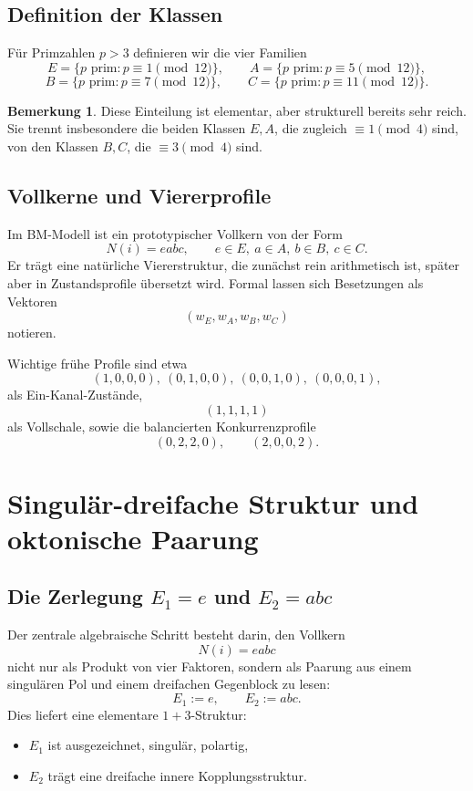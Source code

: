 \documentclass[11pt,a4paper]{article}
\theoremstyle{definition}
\newtheorem{bemerkung}[definition]{Bemerkung}
\theoremstyle{plain}
\begin{document}
	\subsection{Definition der Klassen}
	
	Für Primzahlen $p>3$ definieren wir die vier Familien
	\[
	E=\{p\text{ prim}:p\equiv 1\pmod{12}\},
	\qquad
	A=\{p\text{ prim}:p\equiv 5\pmod{12}\},
	\]
	\[
	B=\{p\text{ prim}:p\equiv 7\pmod{12}\},
	\qquad
	C=\{p\text{ prim}:p\equiv 11\pmod{12}\}.
	\]
	
	\begin{bemerkung}
		Diese Einteilung ist elementar, aber strukturell bereits sehr reich. Sie trennt insbesondere die beiden Klassen $E,A$, die zugleich $\equiv 1\pmod 4$ sind, von den Klassen $B,C$, die $\equiv 3\pmod 4$ sind.
	\end{bemerkung}
	
	\subsection{Vollkerne und Viererprofile}
	
	Im BM-Modell ist ein prototypischer Vollkern von der Form
	\[
	N(i)=eabc,
	\qquad e\in E,\ a\in A,\ b\in B,\ c\in C.
	\]
	Er trägt eine natürliche Viererstruktur, die zunächst rein arithmetisch ist, später aber in Zustandsprofile übersetzt wird. Formal lassen sich Besetzungen als Vektoren
	\[
	(w_E,w_A,w_B,w_C)
	\]
	notieren.
	
	Wichtige frühe Profile sind etwa
	\[
	(1,0,0,0),\ (0,1,0,0),\ (0,0,1,0),\ (0,0,0,1),
	\]
	als Ein-Kanal-Zustände,
	\[
	(1,1,1,1)
	\]
	als Vollschale,
	sowie die balancierten Konkurrenzprofile
	\[
	(0,2,2,0),\qquad (2,0,0,2).
	\]
	
	\section{Singulär-dreifache Struktur und oktonische Paarung}
	
	\subsection{Die Zerlegung $E_1=e$ und $E_2=abc$}
	
	Der zentrale algebraische Schritt besteht darin, den Vollkern
	\[
	N(i)=eabc
	\]
	nicht nur als Produkt von vier Faktoren, sondern als Paarung aus einem singulären Pol und einem dreifachen Gegenblock zu lesen:
	\[
	E_1:=e,
	\qquad
	E_2:=abc.
	\]
	Dies liefert eine elementare $1+3$-Struktur:
	\begin{itemize}[leftmargin=2em]
		\item $E_1$ ist ausgezeichnet, singulär, polartig,
		\item $E_2$ trägt eine dreifache innere Kopplungsstruktur.
	\end{itemize}
	
\end{document}
